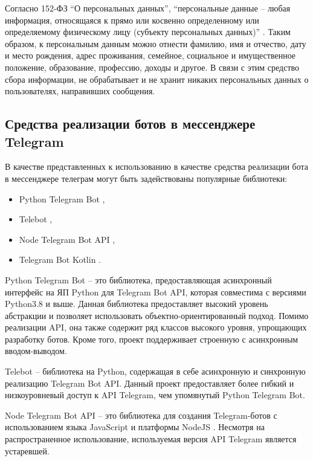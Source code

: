Согласно 152-ФЗ ``О персональных данных'', ``персональные данные -- любая информация, относящаяся к прямо или косвенно определенному или определяемому физическому лицу (субъекту персональных данных)'' \cite{fzpers}. Таким образом, к персональным данным можно отнести фамилию, имя и отчество, дату и место рождения, адрес проживания, семейное, социальное и имущественное положение, образование, профессию, доходы и другое. В связи с этим средство сбора информации, не обрабатывает и не хранит никаких персональных данных о пользователях, направивших сообщения.

\subsection{Средства реализации ботов в мессенджере Telegram}

В качестве представленных к использованию в качестве средства реализации бота в мессенджере телеграм могут быть задействованы популярные библиотеки:

\begin{itemize}
	\item Python Telegram Bot \cite{pythonTelegram},
	\item Telebot \cite{telebot},
	\item Node Telegram Bot API \cite{nodeTelegram},
	\item Telegram Bot Kotlin \cite{kotlinTelegram}.
\end{itemize}

Python Telegram Bot -- это библиотека, предоставляющая асинхронный интерфейс на ЯП Python для Telegram Bot API, которая совместима с версиями Python3.8 \cite{Python} и выше. Данная библиотека предоставляет высокий уровень абстракции и позволяет использовать объектно-ориентированный подход. Помимо реализации API, она также содержит ряд классов высокого уровня, упрощающих разработку ботов. Кроме того, проект поддерживает строенную с асинхронным вводом-выводом. \cite{pythonTelegram}

Telebot -- библиотека на Python, содержащая в себе асинхронную и синхронную реализацию Telegram Bot API. Данный проект предоставляет более гибкий и низкоуровневый доступ к API Telegram, чем упомянутый Python Telegram Bot. \cite{telebot}

Node Telegram Bot API -- это библиотека для создания Telegram-ботов с использованием языка JavaScript \cite{js} и платформы NodeJS \cite{nodejs}. Несмотря на распространенное использование, используемая версия API Telegram является устаревшей. \cite{nodeTelegram}

